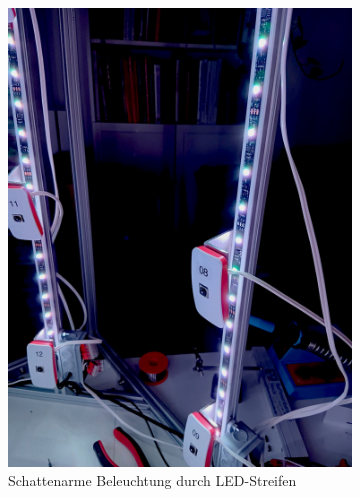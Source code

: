 \documentclass[./00PhotoBox.tex]{subfiles}
\begin{document}
\begin{figure}
    \centering
    \begin{subfigure}{0.45\textwidth}
        \includegraphics[height=1.2\linewidth]{./img/beleuchtung.jpg}
        \centering
        \caption{Schattenarme Beleuchtung durch LED-Streifen} %
        \label{img:led_streifen} %
    \end{subfigure}
    \begin{subfigure}{0.45\textwidth}

\end{subfigure}
\end{figure}
\end{document}
